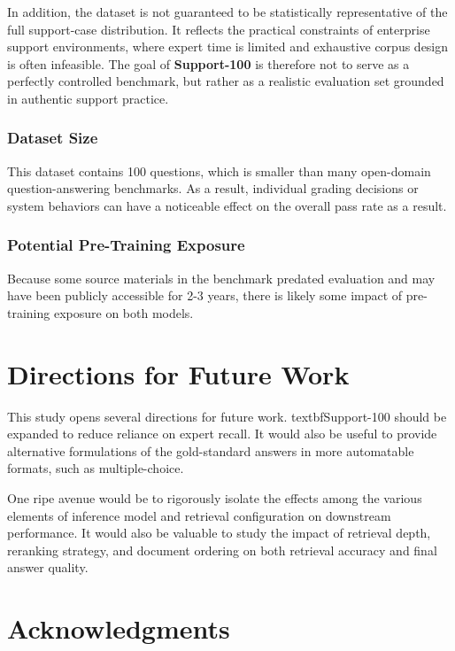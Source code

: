 \documentclass[11pt]{article}
\begin{document}
In addition, the dataset is not guaranteed to be statistically
representative of the full support-case distribution. It reflects the
practical constraints of enterprise support environments, where expert
time is limited and exhaustive corpus design is often infeasible. The
goal of \textbf{Support-100} is therefore not to serve as a perfectly controlled
benchmark, but rather as a realistic evaluation set grounded in
authentic support practice.

\subsubsection{Dataset Size}

This dataset contains 100 questions, which is smaller than many
open-domain question-answering benchmarks. As a result, individual grading
decisions or system behaviors can have a noticeable effect on the
overall pass rate as a result.

\subsubsection{Potential Pre-Training Exposure}

Because some source materials in the benchmark predated evaluation and
may have been publicly accessible for 2-3 years, there is likely some impact of
pre-training exposure on both models.

\section{Directions for Future Work}

This study opens several directions for future work. textbf{Support-100}
should be expanded to reduce reliance on expert recall. It would also
be useful to provide alternative formulations of the gold-standard answers in more
automatable formats, such as multiple-choice.

One ripe avenue would be to rigorously isolate the effects among the various
elements of inference model and
retrieval configuration on downstream performance. It would also be valuable
to study the impact of retrieval depth, reranking strategy, and document
ordering on both retrieval accuracy and final answer quality.

\section{Acknowledgments}
\end{document}
